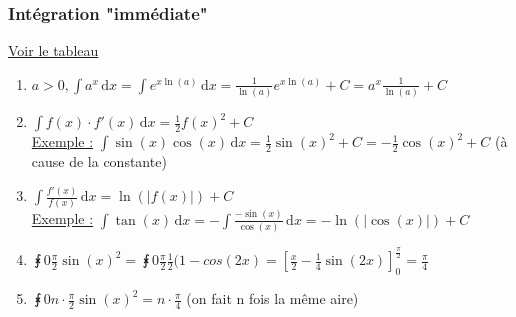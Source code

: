 \documentclass[12pt,a4paper]{article}
\begin{document}
{\subsubsection{Intégration "immédiate"}
\underline{Voir le tableau}
\begin{enumerate}
	\item $a > 0, \int a^x \, \mathrm dx = \int e^{x\ln(a)}  \, \mathrm dx = \frac{1}{\ln(a)}e^{x\ln(a)} + C = a^x\frac{1}{\ln(a)} + C$
	\item $\int f(x)\cdot f'(x)  \, \mathrm dx = \frac{1}{2}f(x)^2 + C$\\
	\underline{Exemple :} $\int \sin(x)\cos(x)  \, \mathrm dx = \frac{1}{2} \sin(x)^2 + C = -\frac{1}{2}\cos(x)^2 + C$ (à cause de la constante)
	\item $\int \frac{f'(x)}{f(x)} \, \mathrm dx = \ln(|f(x)|) + C$\\
	\underline{Exemple :} $\int \tan(x)  \, \mathrm dx = -\int \frac{-\sin(x)}{\cos(x)} \, \mathrm dx = -\ln(|\cos(x)|) + C$
	\item $\intx{0}{\frac{\pi}{2}}{\sin(x)^2} = \intx{0}{\frac{\pi}{2}}{\frac{1}{2}(1-cos(2x)} = [\frac{x}{2}-\frac{1}{4}\sin(2x)]_0^\frac{\pi}{2} = \frac{\pi}{4}$
	\item $\intx{0}{n\cdot\frac{\pi}{2}}{\sin(x)^2} = n \cdot \frac{\pi}{4}$ (on fait n fois la même aire)
\end{enumerate}\
}
\end{document}
